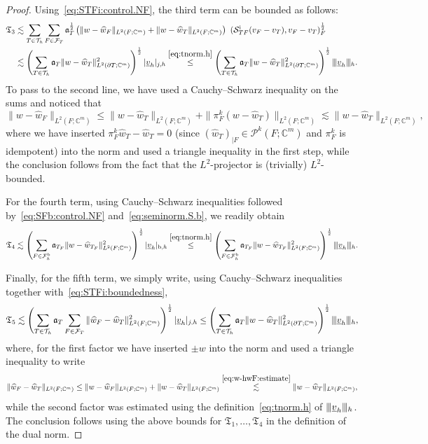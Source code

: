 \documentclass[11pt,a4paper]{article}
\theoremstyle{plain}
\theoremstyle{remark}
\theoremstyle{definition}
\newcommand{\Complex}{\mathbb{C}}
\newcommand{\Th}{\mathcal{T}_h}
\newcommand{\Fhb}{\mathcal{F}_h^{\rm b}}
\newcommand{\FT}{\mathcal{F}_T}
\newcommand{\Poly}[1]{\mathcal{P}^{#1}}
\newcommand{\lproj}[2]{\pi^{#1}_{#2}}
\newcommand{\norm}[2]{\|#2\|_{#1}}
\newcommand{\seminorm}[2]{|#2|_{#1}}
\newcommand{\tnorm}[2]{|\kern-0.25ex|\kern-0.25ex|#2|\kern-0.25ex|\kern-0.25ex|_{#1}}
\newcommand{\term}{\mathfrak{T}}
\newcommand{\Aref}[1][T]{\mathfrak{a}_{#1}}
\begin{document}
\begin{proof}
  Using~\eqref{eq:STFi:control.NF}, the third term can be bounded as follows:
  \[
  \begin{aligned}
    \term_3
    &\lesssim \sum_{T \in \Th} \sum_{F \in \FT} \Aref^{\frac12} \left(
    \norm{L^2(F;\Complex^m)}{w - \widehat{w}_F}
    + \norm{L^2(F;\Complex^m)}{w - \widehat{w}_T}
    \right)~(\mathcal{S}_{TF}^{\rm i} (v_F - v_T), v_F - v_T)_F^{\frac12}
    \\
    &\lesssim \left(
    \sum_{T \in \Th} \Aref \norm{L^2(\partial T;\Complex^m)}{w - \widehat{w}_T}^2
    \right)^{\frac12}
    \seminorm{j,h}{\underline{v}_h}
    \overset{\eqref{eq:tnorm.h}}\le \left(
    \sum_{T \in \Th} \Aref \norm{L^2(\partial T;\Complex^m)}{w - \widehat{w}_T}^2
    \right)^{\frac12}
    \tnorm{h}{\underline{v}_h}.
  \end{aligned}
  \]
  To pass to the second line, we have used a Cauchy--Schwarz inequality on the sums and noticed that
  \begin{equation}\label{eq:w-hwF:estimate}
    \norm{L^2(F;\Complex^m)}{w - \widehat{w}_F}
    \le \norm{L^2(F;\Complex^m)}{w - \widehat{w}_T}
    + \norm{L^2(F;\Complex^m)}{\lproj{k}{F}(w - \widehat{w}_T)}
    \lesssim \norm{L^2(F;\Complex^m)}{w - \widehat{w}_T},
  \end{equation}
  where we have inserted $\lproj{k}{F} \widehat{w}_T - \widehat{w}_T = 0$ (since $(\widehat{w}_T)_{|F} \in \Poly{k}(F;\Complex^m)$ and $\lproj{k}{F}$ is idempotent) into the norm and used a triangle inequality in the first step,
  while the conclusion follows from the fact that the $L^2$-projector is (trivially) $L^2$-bounded.

  For the fourth term, using Cauchy--Schwarz inequalities followed by~\eqref{eq:SFb:control.NF} and~\eqref{eq:seminorm.S.b}, we readily obtain
  \[
  \term_4 \lesssim \left(
  \sum_{F \in \Fhb} \Aref[T_F] \norm{L^2(F;\Complex^m)}{w - \widehat{w}_{T_F}}^2
  \right)^{\frac12}
  \seminorm{{\rm b},h}{\underline{v}_h}
  \overset{\eqref{eq:tnorm.h}}\le
  \left(
  \sum_{F \in \Fhb} \Aref[T_F] \norm{L^2(F;\Complex^m)}{w - \widehat{w}_{T_F}}^2
  \right)^{\frac12}
  \tnorm{h}{\underline{v}_h}.
  \]

  Finally, for the fifth term, we simply write, using Cauchy--Schwarz inequalities together with~\eqref{eq:STFi:boundedness},
  \[
  \term_5 \lesssim
  \left(
  \sum_{T \in \Th} \Aref \sum_{F \in \FT} \norm{L^2(F;\Complex^m)}{\widehat{w}_F - \widehat{w}_T}^2
  \right)^{\frac12}
  \seminorm{j,h}{\underline{v}_h}
  \le
  \left(
  \sum_{T \in \Th} \Aref \norm{L^2(\partial T;\Complex^m)}{w - \widehat{w}_T}^2
  \right)^{\frac12}
  \tnorm{h}{\underline{v}_h},
  \]
  where, for the first factor we have inserted $\pm w$ into the norm and used a triangle inequality to write
  \[
  \norm{L^2(F;\Complex^m)}{\widehat{w}_F - \widehat{w}_T}
  \le \norm{L^2(F;\Complex^m)}{w - \widehat{w}_F}
  + \norm{L^2(F;\Complex^m)}{w - \widehat{w}_T}
  \overset{\eqref{eq:w-hwF:estimate}}\lesssim
  \norm{L^2(F;\Complex^m)}{w - \widehat{w}_T},
  \]
  while the second factor was estimated using the definition~\eqref{eq:tnorm.h} of $\tnorm{h}{\underline{v}_h}$.
  The conclusion follows using the above bounds for $\term_1,\ldots,\term_4$ in the definition of the dual norm.
\end{proof}
\end{document}
